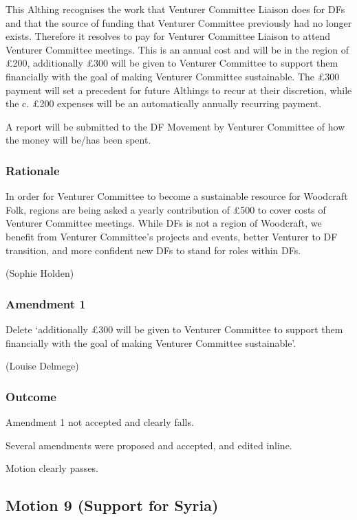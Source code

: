 \documentclass[a4paper, 11pt]{article} %
\begin{document}
This Althing recognises the work that Venturer Committee Liaison does for DFs and that the source of funding that Venturer Committee previously had no longer exists.  Therefore it resolves to pay for Venturer Committee Liaison to attend Venturer Committee meetings.  This is an annual cost and will be in the region of £200, additionally £300 will be given to Venturer Committee to support them financially with the goal of making Venturer Committee sustainable.  The £300 payment will set a precedent for future Althings to recur at their discretion, while the c. £200 expenses will be an automatically annually recurring payment.

A report will be submitted to the DF Movement by Venturer Committee of how the money will be/has been spent.

\subsubsection{Rationale}
In order for Venturer Committee to become a sustainable resource for Woodcraft Folk, regions are being asked a yearly contribution of £500 to cover costs of Venturer Committee meetings.  While DFs is not a region of Woodcraft, we benefit from Venturer Committee's projects and events, better Venturer to DF transition, and more confident new DFs to stand for roles within DFs.

(Sophie Holden)

\subsubsection{Amendment 1}

Delete `additionally £300 will be given to Venturer Committee to support them financially with the goal of making Venturer Committee sustainable'.

(Louise Delmege)

\subsubsection{Outcome}

Amendment 1 not accepted and clearly falls.

Several amendments were proposed and accepted, and edited inline.

Motion clearly passes.

\subsection{Motion 9 (Support for Syria)}
\end{document}
